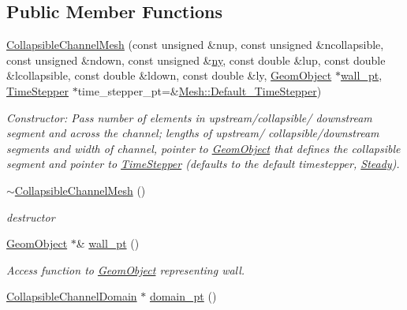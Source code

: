 \subsection*{Public Member Functions}
\begin{DoxyCompactItemize}
\item 
\hyperlink{classoomph_1_1CollapsibleChannelMesh_a4e0b14ef4b4531f043b588150ca3c0f1}{Collapsible\+Channel\+Mesh} (const unsigned \&nup, const unsigned \&ncollapsible, const unsigned \&ndown, const unsigned \&\hyperlink{classoomph_1_1SimpleRectangularQuadMesh_a45011f22dedd480392b1f376e4269921}{ny}, const double \&lup, const double \&lcollapsible, const double \&ldown, const double \&ly, \hyperlink{classoomph_1_1GeomObject}{Geom\+Object} $\ast$\hyperlink{classoomph_1_1CollapsibleChannelMesh_a04ffeb61678763dfd250962ea9ba614b}{wall\+\_\+pt}, \hyperlink{classoomph_1_1TimeStepper}{Time\+Stepper} $\ast$time\+\_\+stepper\+\_\+pt=\&\hyperlink{classoomph_1_1Mesh_a12243d0fee2b1fcee729ee5a4777ea10}{Mesh\+::\+Default\+\_\+\+Time\+Stepper})
\begin{DoxyCompactList}\small\item\em Constructor\+: Pass number of elements in upstream/collapsible/ downstream segment and across the channel; lengths of upstream/ collapsible/downstream segments and width of channel, pointer to \hyperlink{classoomph_1_1GeomObject}{Geom\+Object} that defines the collapsible segment and pointer to \hyperlink{classoomph_1_1TimeStepper}{Time\+Stepper} (defaults to the default timestepper, \hyperlink{classoomph_1_1Steady}{Steady}). \end{DoxyCompactList}\item 
\hyperlink{classoomph_1_1CollapsibleChannelMesh_a1c9b2ab27f1fb2f764ae2dc6f9f7a429}{$\sim$\+Collapsible\+Channel\+Mesh} ()
\begin{DoxyCompactList}\small\item\em destructor \end{DoxyCompactList}\item 
\hyperlink{classoomph_1_1GeomObject}{Geom\+Object} $\ast$\& \hyperlink{classoomph_1_1CollapsibleChannelMesh_a04ffeb61678763dfd250962ea9ba614b}{wall\+\_\+pt} ()
\begin{DoxyCompactList}\small\item\em Access function to \hyperlink{classoomph_1_1GeomObject}{Geom\+Object} representing wall. \end{DoxyCompactList}\item 
\hyperlink{classoomph_1_1CollapsibleChannelDomain}{Collapsible\+Channel\+Domain} $\ast$ \hyperlink{classoomph_1_1CollapsibleChannelMesh_a379365813e6c3566639dc55a971f0b10}{domain\+\_\+pt} ()

\end{DoxyCompactItemize}
